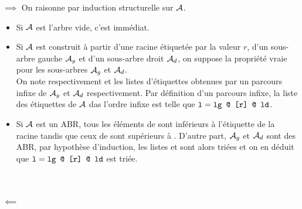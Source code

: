 \begin{demonstration}
    $\implies$ On raisonne par induction structurelle sur $\mathcal{A}$.
    \begin{itemize}
        \item Si $\mathcal{A}$ est l'arbre vide, c'est immédiat.
        \item Si $\mathcal{A}$ est construit à partir d'une racine étiquetée par la valeur $r$, d'un sous-arbre gauche $\mathcal{A}_g$ et d'un sous-arbre droit $\mathcal{A}_d$, on suppose la propriété vraie pour les sous-arbres $\mathcal{A}_g$ et $\mathcal{A}_d$. \\ On note respectivement  et  les listes d'étiquettes obtenues par un parcours infixe de $\mathcal{A}_g$ et $\mathcal{A}_d$ respectivement. Par définition d'un parcours infixe, la liste  des étiquettes de $\mathcal{A}$ das l'ordre infixe est telle que $\texttt{l} = \texttt{lg @ [r] @ ld}$.
        \item Si $\mathcal{A}$ est un ABR, tous les éléments de  sont inférieurs à l’étiquette de la racine tandis que ceux de  sont supérieurs à . D’autre part, $\mathcal{A}_g$ et $\mathcal{A}_d$ sont des ABR, par hypothèse d’induction, les listes  et  sont alors triées et on en déduit que $\texttt{l}=\texttt{lg @ [r] @ ld}$ est triée.
    \end{itemize} \\ \\
    $\impliedby$
\end{demonstration}

